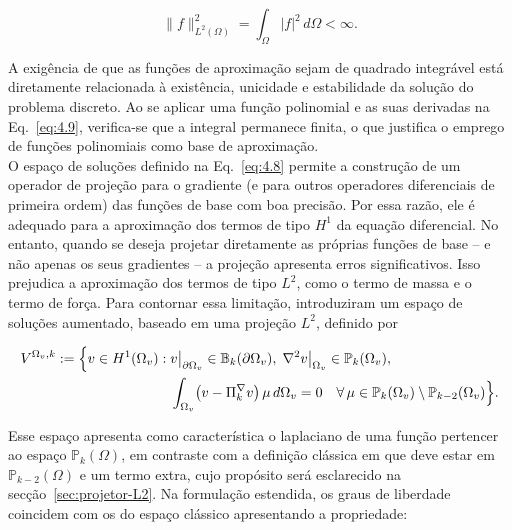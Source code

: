     \begin{equation}
        \|f\|_{L^2(\Omega)}^2 = \int_{\Omega} |f|^2 \, d\Omega < \infty.
        \label{eq:4.9}
    \end{equation}

    \indent A exigência de que as funções de aproximação sejam de quadrado integrável está diretamente relacionada à existência, unicidade e estabilidade da solução do problema discreto. Ao se aplicar uma função polinomial e as suas derivadas na Eq.~\ref{eq:4.9}, verifica-se que a integral permanece finita, o que justifica o emprego de funções polinomiais como base de aproximação.\\
    \indent O espaço de soluções definido na Eq.~\ref{eq:4.8} permite a construção de um operador de projeção para o gradiente (e para outros operadores diferenciais de primeira ordem) das funções de base com boa precisão. Por essa razão, ele é adequado para a aproximação dos termos de tipo \(H^1\) da equação diferencial. No entanto, quando se deseja projetar diretamente as próprias funções de base -- e não apenas os seus gradientes -- a projeção apresenta erros significativos. Isso prejudica a aproximação dos termos de tipo \(L^2\), como o termo de massa e o termo de força. Para contornar essa limitação, \citet{equivalentprojectorsvirtualelementmethods2013a} introduziram um espaço de soluções aumentado, baseado em uma projeção \(L^2\), definido por

    \begin{equation}
        \begin{aligned}
            V^{\Omega_v,k} := \Bigl\{ v \in H^1(\Omega_v) :\;& v\big|_{\partial\Omega_v} \in \mathbb{B}_k(\partial\Omega_v),\; \nabla^2 v\big|_{\Omega_v} \in \mathbb{P}_k(\Omega_v), \\ & \int_{\Omega_v} \bigl(v - \Pi_k^{\nabla} v\bigr)\,\mu \,d\Omega_v = 0 \quad \forall\,\mu \in \mathbb{P}_k(\Omega_v)\setminus\mathbb{P}_{k-2}(\Omega_v)\Bigr\}.
        \end{aligned}
        \label{eq:4.10}
    \end{equation}

    \indent Esse espaço apresenta como característica o laplaciano de uma função pertencer ao espaço $\mathbb{P}_k(\Omega)$, em contraste com a definição clássica em que deve estar em $\mathbb{P}_{k-2}(\Omega)$ e um termo extra, cujo propósito será esclarecido na secção~\ref{sec:projetor-L2}. Na formulação estendida, os graus de liberdade coincidem com os do espaço clássico apresentando a propriedade: 

